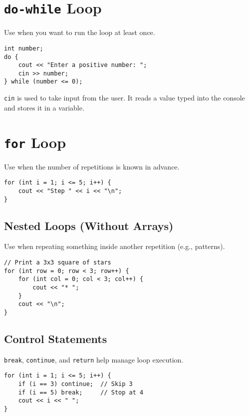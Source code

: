 \documentclass{article}
\begin{document}
\section{\texttt{do-while} Loop}

Use when you want to run the loop at least once.

\begin{lstlisting}[style=cppstyle]
int number;
do {
    cout << "Enter a positive number: ";
    cin >> number;
} while (number <= 0);
\end{lstlisting}

\texttt{cin} is used to take input from the user. It reads a value typed into the console and stores it in a variable.

\section{\texttt{for} Loop}

Use when the number of repetitions is known in advance.

\begin{lstlisting}[style=cppstyle]
for (int i = 1; i <= 5; i++) {
    cout << "Step " << i << "\n";
}
\end{lstlisting}

\subsection{Nested Loops (Without Arrays)}

Use when repeating something inside another repetition (e.g., patterns).

\begin{lstlisting}[style=cppstyle]
// Print a 3x3 square of stars
for (int row = 0; row < 3; row++) {
    for (int col = 0; col < 3; col++) {
        cout << "* ";
    }
    cout << "\n";
}
\end{lstlisting}

\subsection{Control Statements}

\texttt{break}, \texttt{continue}, and \texttt{return} help manage loop execution.

\begin{lstlisting}[style=cppstyle]
for (int i = 1; i <= 5; i++) {
    if (i == 3) continue;  // Skip 3
    if (i == 5) break;     // Stop at 4
    cout << i << " ";
}
\end{lstlisting}
\end{document}
